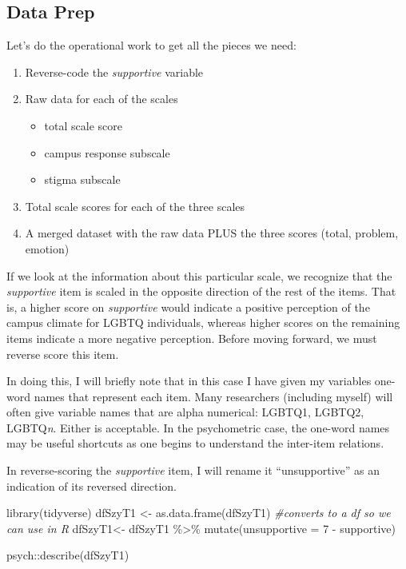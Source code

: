 \documentclass[
  english,
]{book}
\newenvironment{Shaded}{\begin{snugshade}}{\end{snugshade}}
\newcommand{\AttributeTok}[1]{\textcolor[rgb]{0.77,0.63,0.00}{#1}}
\newcommand{\CommentTok}[1]{\textcolor[rgb]{0.56,0.35,0.01}{\textit{#1}}}
\newcommand{\DecValTok}[1]{\textcolor[rgb]{0.00,0.00,0.81}{#1}}
\newcommand{\FunctionTok}[1]{\textcolor[rgb]{0.00,0.00,0.00}{#1}}
\newcommand{\NormalTok}[1]{#1}
\newcommand{\OtherTok}[1]{\textcolor[rgb]{0.56,0.35,0.01}{#1}}
\newcommand{\SpecialCharTok}[1]{\textcolor[rgb]{0.00,0.00,0.00}{#1}}
\providecommand{\tightlist}{%
  \setlength{\itemsep}{0pt}\setlength{\parskip}{0pt}}
\begin{document}
\hypertarget{data-prep}{%
\subsection{Data Prep}\label{data-prep}}

Let's do the operational work to get all the pieces we need:

\begin{enumerate}
\def\labelenumi{\arabic{enumi}.}
\tightlist
\item
  Reverse-code the \emph{supportive} variable
\item
  Raw data for each of the scales

  \begin{itemize}
  \tightlist
  \item
    total scale score
  \item
    campus response subscale
  \item
    stigma subscale
  \end{itemize}
\item
  Total scale scores for each of the three scales
\item
  A merged dataset with the raw data PLUS the three scores (total, problem, emotion)
\end{enumerate}

If we look at the information about this particular scale, we recognize that the \emph{supportive} item is scaled in the opposite direction of the rest of the items. That is, a higher score on \emph{supportive} would indicate a positive perception of the campus climate for LGBTQ individuals, whereas higher scores on the remaining items indicate a more negative perception. Before moving forward, we must reverse score this item.

In doing this, I will briefly note that in this case I have given my variables one-word names that represent each item. Many researchers (including myself) will often give variable names that are alpha numerical: LGBTQ1, LGBTQ2, LGBTQ\emph{n}. Either is acceptable. In the psychometric case, the one-word names may be useful shortcuts as one begins to understand the inter-item relations.

In reverse-scoring the \emph{supportive} item, I will rename it ``unsupportive'' as an indication of its reversed direction.

\begin{Shaded}
\begin{Highlighting}[]
\FunctionTok{library}\NormalTok{(tidyverse)}
\NormalTok{dfSzyT1 }\OtherTok{\textless{}{-}} \FunctionTok{as.data.frame}\NormalTok{(dfSzyT1) }\CommentTok{\#converts to a df so we can use in R}
\NormalTok{dfSzyT1}\OtherTok{\textless{}{-}}\NormalTok{ dfSzyT1 }\SpecialCharTok{\%\textgreater{}\%}
  \FunctionTok{mutate}\NormalTok{(}\AttributeTok{unsupportive =} \DecValTok{7} \SpecialCharTok{{-}}\NormalTok{ supportive)}

\NormalTok{psych}\SpecialCharTok{::}\FunctionTok{describe}\NormalTok{(dfSzyT1)}
\end{Highlighting}
\end{Shaded}
\end{document}
